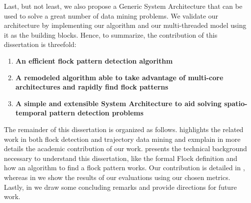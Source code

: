 Last, but not least, we also propose a Generic System Architecture that can be used to solve a great number of data mining
problems. We validate our architecture by implementing our algorithm and our multi-threaded model using it as the
building blocks. Hence, to summarize, the contribution of this dissertation is threefold:

\begin{enumerate}
    \item \textbf{An efficient flock pattern detection algorithm}
    \item \textbf{A remodeled algorithm able to take advantage of multi-core architectures and rapidly find flock
        patterns}
    \item \textbf{A simple and extensible System Architecture to aid solving spatio-temporal pattern detection problems}
\end{enumerate}

The remainder of this dissertation is organized as follows.  highlights the related work in
both flock detection and trajectory data mining and exmplain in more details the academic contribution of our work.
 presents the technical background necessary to understand this dissertation, like the
formal Flock definition and how an algorithm to find a flock pattern works. Our contribution is detailed in
, whereas in  we show the results of our evaluations using our chosen
metrics. Lastly, in  we draw some concluding remarks and provide directions for future work.
